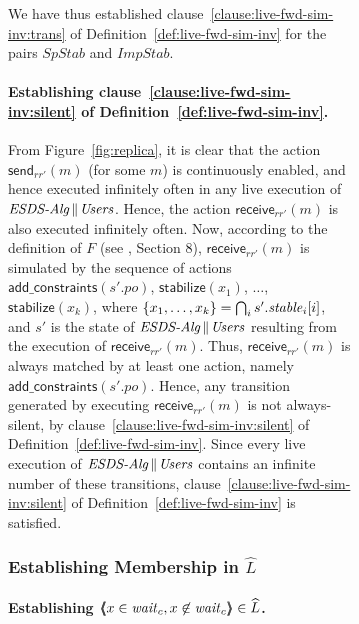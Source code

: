 \documentclass[11pt]{article}
\newcommand{\INT}{\bigcap}
\newcommand{\pl}{\!\parallel\!}
\newcommand{\pair}[2]{\lpb #1, #2 \rpb}
\newcommand{\lpb}{\langle \hspace{-0.34em} \langle \hspace{-0.34em} \langle}
\newcommand{\rpb}{\rangle \hspace{-0.34em} \rangle \hspace{-0.34em} \rangle}
\newcommand{\clos}[1]{\widehat{{#1}}}	\newcommand{\esig}{\mathit{esig}}
\newcommand{\ESDSAlg}{\mbox{\textit{ESDS-Alg}}}
\newcommand{\SpStab}{\mathit{SpStab}}
\newcommand{\ImpStab}{\mathit{ImpStab}}
\newcommand{\Users}{\mbox{\textit{Users}}}
\newcommand{\ms}[1]{\relax\ifmmode
                \mathord{\mathcode`\-="702D\it #1\mathcode`\-="2200}\else
{\it #1}\fi
}
\newcommand{\action}[1]{\textsf{#1}}
\newcommand{\statevar}[1]{\ms{#1}}
\newcommand{\send}{\action{send}}
\newcommand{\receive}{\action{receive}}
\newcommand{\stabilize}{\action{stabilize}}
\newcommand{\addcons}{\action{add\_constraints}}
\newcommand{\wait}{\statevar{wait}}
\newcommand{\stable}{\statevar{stable}}
\newcommand{\set}[1]{\{#1\}}
\begin{document}
\begin{figure}[htb]
\begin{figure}[htb]
We have thus established  clause~\ref{clause:live-fwd-sim-inv:trans} of
Definition~\ref{def:live-fwd-sim-inv} for the pairs $\SpStab$ and $\ImpStab$.








\paragraph{Establishing clause~\ref{clause:live-fwd-sim-inv:silent} of
Definition~\ref{def:live-fwd-sim-inv}.}
From Figure~\ref{fig:replica}, it is clear that the action
$\send_{rr'}(m)$ (for some $m$) is continuously enabled, and hence
executed infinitely often in any live execution of $\ESDSAlg \pl
\Users$.  Hence, the action $\receive_{rr'}(m)$ is also executed
infinitely often. Now, according to the definition of $F$ (see
\cite{FGLLS99}, Section 8), $\receive_{rr'}(m)$ is simulated by
the sequence of actions
$\addcons(s'.po)$, $\stabilize(x_1)$, $\ldots$, $\stabilize(x_k)$, where
$\set{x_1,\ldots,x_k} = \INT_i s'.\stable_i[i]$, and $s'$ is the state
of $\ESDSAlg \pl \Users$
resulting from the execution of $\receive_{rr'}(m)$.  Thus,
$\receive_{rr'}(m)$ is always matched by at least one action, namely
$\addcons(s'.po)$. Hence, any transition generated by executing
$\receive_{rr'}(m)$ is not always-silent, by
clause~\ref{clause:live-fwd-sim-inv:silent} of
Definition~\ref{def:live-fwd-sim-inv}.  Since every live execution
of $\ESDSAlg \pl \Users$ contains an infinite number of these transitions,
clause~\ref{clause:live-fwd-sim-inv:silent} of
Definition~\ref{def:live-fwd-sim-inv} is satisfied.



\subsubsection{Establishing Membership in $\clos{L}$}


\paragraph{Establishing $\pair{x \in \wait_c}{x \not\in \wait_c} \in \clos{L}$.}


\end{figure}
\end{figure}
\end{document}
